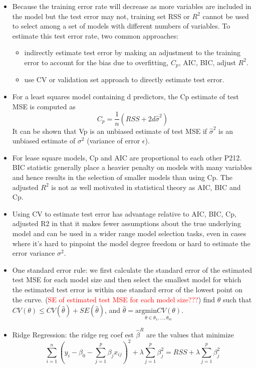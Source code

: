 \documentclass[a4paper, 12pt]{article}
\begin{document}
\begin{itemize}
	\item Because the training error rate will decrease as more variables are included in the model but the test error may not, training set RSS or $R^2$ cannot be used to select among a set of models with different numbers of variables. To estimate this test error rate, two common approaches:
	\begin{itemize}
		\item indirectly estimate test error by making an adjustment to the training error to account for the bias due to overfitting, $C_p$, AIC, BIC, adjust $R^2$.
		\item use CV or validation set approach to directly estimate test error.
	\end{itemize}
	\item For a least squares model containing d predictors, the Cp estimate of test MSE is computed as \[C_p=\frac{1}{n}(RSS + 2d\hat{\sigma}^2)
	\]
	It can be shown that Vp is an unbiased estimate of test MSE if $\hat{\sigma}^2$ is an unbiased estimate of ${\sigma}^2$ (variance of error $\epsilon$). 
	\item For lease square models, Cp and AIC are proportional to each other P212. BIC statistic generally place a heavier penalty on models with many variables and hence results in the selection of smaller models than using Cp. The adjusted $R^2$ is not as well motivated in statistical theory as AIC, BIC and Cp. 
	\item Using CV to estimate test error has advantage relative to AIC, BIC, Cp, adjusted R2 in that it makes fewer assumptions about the true underlying model and can be used in a wider range model selection tasks, even in cases where it's hard to pinpoint the model degree freedom or hard to estimate the error variance $\sigma^2$.
	\item One standard error rule: we first calculate the standard error of the estimated test MSE for each model size and then select the smallest model for which the estimated test error is within one standard error of the lowest point on the curve. (\textcolor{red}{SE of estimated test MSE for each model size???})
	find $\theta$ such that $CV(\theta) \le CV(\hat{\theta}) + SE(\hat{\theta})$, and $\hat{\theta}=\underset{\theta \in \theta_1,\ldots,\theta_m}{\mathrm{argmin} CV(\theta)}$.
	\item Ridge Regression: the ridge reg coef est $\hat{\beta}^R$ are the values that minimize
	\[ \sum_{i=1}^{n}(y_i-\beta_0-\sum_{j=1}^{p}\beta_jx_{ij})^2 +\lambda\sum_{j=1}^{p}\beta_j^2= RSS +\lambda\sum_{j=1}^{p}\beta_j^2
\]
\end{itemize}
\end{document}
